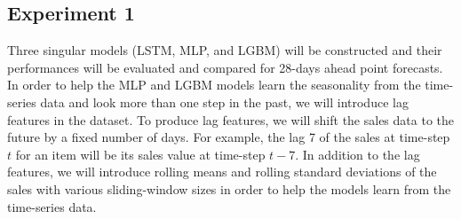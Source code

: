 \subsection*{Experiment 1}
Three singular models (LSTM, MLP, and LGBM) will be constructed and their performances will be evaluated and compared for 28-days ahead point forecasts. 
In order to help the MLP and LGBM models learn the seasonality from the time-series data and look more than one step in the past, we will introduce lag features in the dataset. 
To produce lag features, we will shift the sales data to the future by a fixed number of days. 
For example, the lag 7 of the sales at time-step \(t\) for an item will be its sales value at time-step \(t-7\). 
In addition to the lag features, we will introduce rolling means and rolling standard deviations of the sales with various sliding-window sizes in order to help the models learn from the time-series data.

